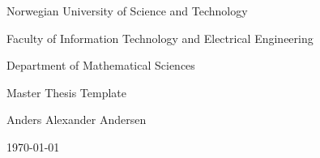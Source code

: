 \begin{titlepage}
\null\vfill
\begin{center}\Large
Norwegian University of Science and Technology\par
Faculty of Information Technology and Electrical Engineering\par
Department of Mathematical Sciences\par
\vskip1cm
\huge Master Thesis Template  \par
\vskip1cm
\large Anders Alexander Andersen\par
\today

\end{center}\vfill
\end{titlepage}